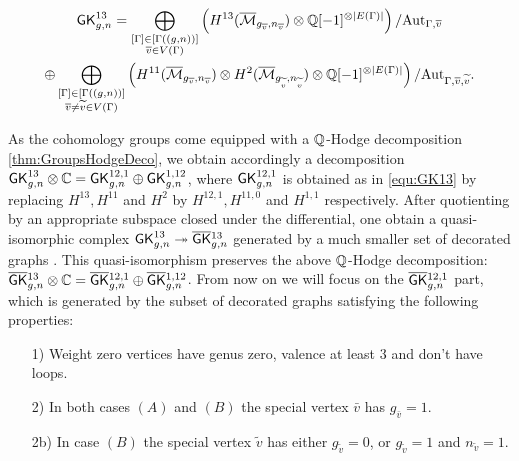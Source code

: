 \begin{multline}\label{equ:GK13}
    \mathsf{GK}^{13}_{g,n}
    = \bigoplus_{\substack{ [\Gamma]\in[\Gamma((g,n))] \\ \overline{v}\in V(\Gamma)}}
    \left( H^{13}(\overline{\mathcal{M}}_{g_{\overline{v}},n_{\overline{v}}}) \otimes \mathbb{Q}[-1]^{\otimes |E(\Gamma)|} \right)/\text{Aut}_{\Gamma,\overline{v}} \\
    \oplus \bigoplus_{\substack{ [\Gamma]\in[\Gamma((g,n))] \\ \overline{v}\neq\widetilde{v}\in V(\Gamma)}}
    \left( H^{11}(\overline{\mathcal{M}}_{g_{\overline{v}},n_{\overline{v}}}) \otimes H^{2}(\overline{\mathcal{M}}_{g_{\widetilde{v}},n_{\widetilde{v}}}) \otimes \mathbb{Q}[-1]^{\otimes |E(\Gamma)|} \right)/\text{Aut}_{\Gamma,\overline{v},\widetilde{v}} .
\end{multline}


As the cohomology groups come equipped with a $\mathbb{Q}$-Hodge decomposition \ref{thm:GroupsHodgeDeco}, we obtain accordingly a decomposition $\mathsf{GK}_{g,n}^{13}\otimes\mathbb{C} = \mathsf{GK}_{g,n}^{12,1} \oplus \mathsf{GK}_{g,n}^{1,12}$, where $\mathsf{GK}_{g,n}^{12,1}$ is obtained as in \ref{equ:GK13} by replacing $H^{13}, H^{11}$ and $H^{2}$ by $H^{12,1}, H^{11,0}$ and $H^{1,1}$ respectively. After quotienting by an appropriate subspace closed under the differential, one obtain a quasi-isomorphic complex $\mathsf{GK}_{g,n}^{13}\twoheadrightarrow \overline{\mathsf{GK}}{}_{g,n}^{13}$ generated by a much smaller set of decorated graphs \cite[Section 2.2]{CLPW2}. This quasi-isomorphism preserves the above $\mathbb{Q}$-Hodge decomposition: $\overline{\mathsf{GK}}{}_{g,n}^{13}\otimes\mathbb{C} = \overline{\mathsf{GK}}{}_{g,n}^{12,1} \oplus \overline{\mathsf{GK}}{}_{g,n}^{1,12}$. From now on we will focus on the $\overline{\mathsf{GK}}{}_{g,n}^{12,1}$ part, which is generated by the subset of decorated graphs satisfying the following properties:

\begin{enumerate}
    \item[1)] Weight zero vertices have genus zero, valence at least $3$ and don't have loops.
    \item[2)] In both cases $(A)$ and $(B)$ the special vertex $\bar{v}$ has $g_{\bar{v}}=1$.
    \item[2b)] In case $(B)$ the special vertex $\tilde{v}$ has either $g_{\tilde{v}}=0$, or $g_{\tilde{v}}=1$ and $n_{\tilde{v}}=1$.
\end{enumerate}


